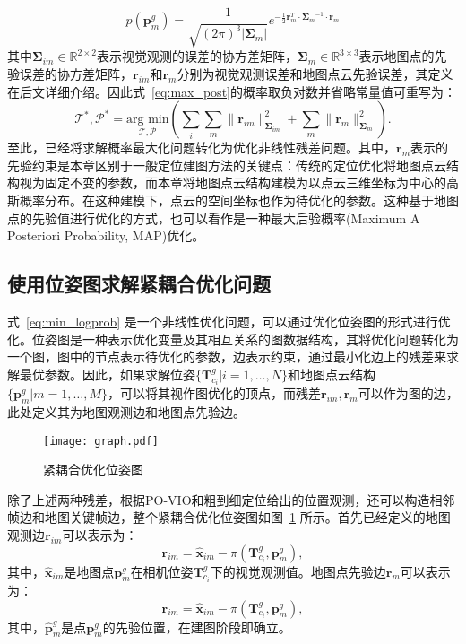 \begin{equation}
  p(\symbf{p}_m^g) = \frac{1}{\sqrt{(2\pi)^3|\symbf{\Sigma}_m|}}e^{-\frac{1}{2}\symbf{r}_{m}^T \cdot {\symbf{\Sigma}_{m}}^{-1} \cdot \symbf{r}_{m}}
\end{equation}
其中$\symbf{\Sigma}_{im}\in \mathbb{R}^{2\times 2}$表示视觉观测的误差的协方差矩阵，$\symbf{\Sigma}_{m} \in \mathbb{R}^{3 \times 3}$表示地图点的先验误差的协方差矩阵，$\symbf{r}_{im}$和$\symbf{r}_m$分别为视觉观测误差和地图点云先验误差，其定义在后文详细介绍。因此式~\eqref{eq:max_post}的概率取负对数并省略常量值可重写为：
\begin{equation}
\label{eq:min_logprob}
\mathcal{T}^*, \mathcal{P}^* = \underset{\mathcal{T}, \mathcal{P}}{\text{arg min}} \left( \sum_i \sum_m \| \symbf{r}_{im} \|_{\symbf{\Sigma}_{im}}^2 + \sum_m \| \symbf{r}_m \|_{\symbf{\Sigma}_{m}}^2 \right).
\end{equation}
至此，已经将求解概率最大化问题转化为优化非线性残差问题。其中，$\symbf{r}_{m}$表示的先验约束是本章区别于一般定位建图方法的关键点：传统的定位优化将地图点云结构视为固定不变的参数，而本章将地图点云结构建模为以点云三维坐标为中心的高斯概率分布。在这种建模下，点云的空间坐标也作为待优化的参数。这种基于地图点的先验值进行优化的方式，也可以看作是一种最大后验概率(Maximum A Posteriori Probability, MAP)优化。

\subsection{使用位姿图求解紧耦合优化问题}
\label{sec:loc_pg}

式~\eqref{eq:min_logprob} 是一个非线性优化问题，可以通过优化位姿图的形式进行优化。位姿图是一种表示优化变量及其相互关系的图数据结构，其将优化问题转化为一个图，图中的节点表示待优化的参数，边表示约束，通过最小化边上的残差来求解最优参数。因此，如果求解位姿$\{ \symbf{T}_{c_i}^g | i=1,\dots, N\}$和地图点云结构$\{\symbf{p}^g_m | m = 1, \dots, M\}$，可以将其视作图优化的顶点，而残差$\symbf{r}_{im}, \symbf{r}_m$可以作为图的边，此处定义其为地图观测边和地图点先验边。

\begin{figure}
  \centering
  \texttt{[image: graph.pdf]}
  \caption{紧耦合优化位姿图}
  \label{fig:graph}
\end{figure}

除了上述两种残差，根据PO-VIO和粗到细定位给出的位置观测，还可以构造相邻帧边和地图关键帧边，整个紧耦合优化位姿图如图~\ref{fig:graph} 所示。首先已经定义的地图观测边$\symbf{r}_{im}$可以表示为：
\begin{equation}
  \symbf{r}_{im} = \hat{\symbf{x}}_{im} - \pi(\symbf{T}_{c_{i}}^g, \symbf{p}^g_m),
\end{equation}
其中，$\hat{\symbf{x}}_{im}$是地图点$\symbf{p}^g_m$在相机位姿$\symbf{T}_{c_{i}}^g$下的视觉观测值。地图点先验边$\symbf{r}_m$可以表示为：
\begin{equation}
  \symbf{r}_{im} = \hat{\symbf{x}}_{im} - \pi(\symbf{T}_{c_{i}}^g, \symbf{p}^g_m),
\end{equation}
其中，$\hat{\symbf{p}}^g_m$是点$\symbf{p}^g_m$的先验位置，在建图阶段即确立。

